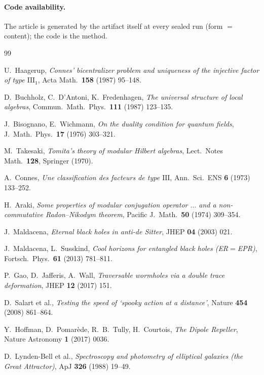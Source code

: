 \documentclass[11pt]{article}
\theoremstyle{definition}\newtheorem{deriv}{Derivation}
\begin{document}
\paragraph{Code availability.} The article is generated by the artifact itself at every sealed run (form $=$ content); the code is the method.

\begin{thebibliography}{99}\small\setlength{\itemsep}{0pt}

 U.~Haagerup, \emph{Connes' bicentralizer problem and uniqueness of the injective factor of type $\mathrm{III}_1$}, Acta Math.\ \textbf{158} (1987) 95--148.

 D.~Buchholz, C.~D'Antoni, K.~Fredenhagen, \emph{The universal structure of local algebras}, Commun.\ Math.\ Phys.\ \textbf{111} (1987) 123--135.

 J.~Bisognano, E.~Wichmann, \emph{On the duality condition for quantum fields}, J.\ Math.\ Phys.\ \textbf{17} (1976) 303--321.

 M.~Takesaki, \emph{Tomita's theory of modular Hilbert algebras}, Lect.\ Notes Math.\ \textbf{128}, Springer (1970).

 A.~Connes, \emph{Une classification des facteurs de type $\mathrm{III}$}, Ann.\ Sci.\ ENS \textbf{6} (1973) 133--252.

 H.~Araki, \emph{Some properties of modular conjugation operator $\ldots$ and a non-commutative Radon--Nikodym theorem}, Pacific J.\ Math.\ \textbf{50} (1974) 309--354.

 J.~Maldacena, \emph{Eternal black holes in anti-de Sitter}, JHEP \textbf{04} (2003) 021.

 J.~Maldacena, L.~Susskind, \emph{Cool horizons for entangled black holes (ER$=$EPR)}, Fortsch.\ Phys.\ \textbf{61} (2013) 781--811.

 P.~Gao, D.~Jafferis, A.~Wall, \emph{Traversable wormholes via a double trace deformation}, JHEP \textbf{12} (2017) 151.

 D.~Salart et al., \emph{Testing the speed of `spooky action at a distance'}, Nature \textbf{454} (2008) 861--864.

 Y.~Hoffman, D.~Pomar\`ede, R.~B.~Tully, H.~Courtois, \emph{The Dipole Repeller}, Nature Astronomy \textbf{1} (2017) 0036.

 D.~Lynden-Bell et al., \emph{Spectroscopy and photometry of elliptical galaxies (the Great Attractor)}, ApJ \textbf{326} (1988) 19--49.


\end{thebibliography}
\end{document}

